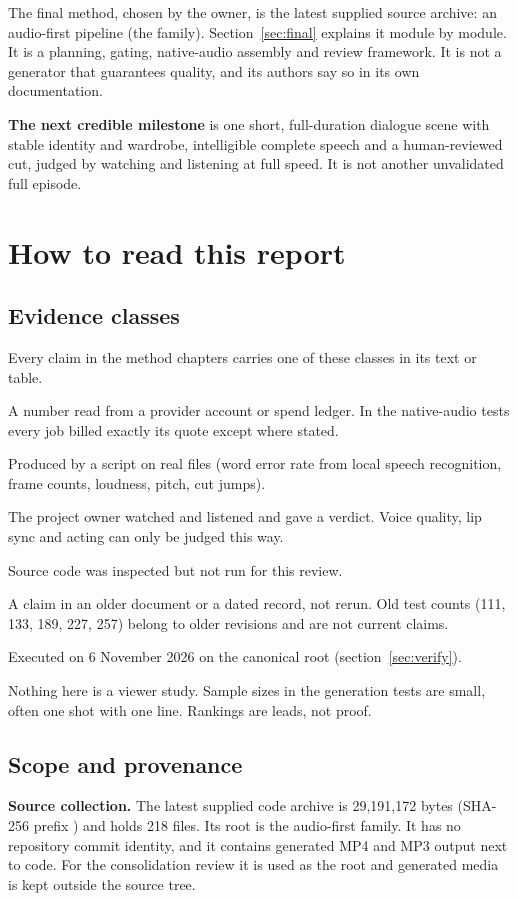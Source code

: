 \documentclass[11pt,a4paper]{article}
\newcommand{\code}[1]{\texttt{\detokenize{#1}}}
\begin{document}
The final method, chosen by the owner, is the latest supplied source archive: an audio-first pipeline (the \code{magicdrama/audiofirst} family). Section~\ref{sec:final} explains it module by module. It is a planning, gating, native-audio assembly and review framework. It is not a generator that guarantees quality, and its authors say so in its own documentation.

\textbf{The next credible milestone} is one short, full-duration dialogue scene with stable identity and wardrobe, intelligible complete speech and a human-reviewed cut, judged by watching and listening at full speed. It is not another unvalidated full episode.

\section{How to read this report}
\subsection{Evidence classes}
Every claim in the method chapters carries one of these classes in its text or table.
\begin{description}[leftmargin=2.2cm,style=nextline]
\item[Billed] A number read from a provider account or spend ledger. In the native-audio tests every job billed exactly its quote except where stated.
\item[Measured] Produced by a script on real files (word error rate from local speech recognition, frame counts, loudness, pitch, cut jumps).
\item[Judged] The project owner watched and listened and gave a verdict. Voice quality, lip sync and acting can only be judged this way.
\item[Static] Source code was inspected but not run for this review.
\item[Historical] A claim in an older document or a dated record, not rerun. Old test counts (111, 133, 189, 227, 257) belong to older revisions and are not current claims.
\item[Fresh] Executed on 6 November 2026 on the canonical root (section~\ref{sec:verify}).
\end{description}
Nothing here is a viewer study. Sample sizes in the generation tests are small, often one shot with one line. Rankings are leads, not proof.

\subsection{Scope and provenance}
\textbf{Source collection.} The latest supplied code archive is 29,191,172 bytes (SHA-256 prefix \code{9f3927df...ef788}) and holds 218 files. Its root is the audio-first family. It has no repository commit identity, and it contains generated MP4 and MP3 output next to code. For the consolidation review it is used as the root and generated media is kept outside the source tree.
\end{document}
